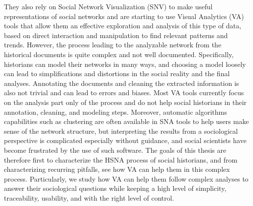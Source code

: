 They also rely on Social Network Visualization (SNV) to make useful representations of social networks and are starting to use Visual Analytics (VA) tools that allow them an effective exploration and analysis of this type of data, based on direct interaction and manipulation to find relevant patterns and trends.
However, the process leading to the analyzable network from the historical documents is quite complex and not well documented.
Specifically, historians can model their networks in many ways, and choosing a model loosely can lead to simplifications and distortions in the social reality and the final analyses.
Annotating the documents and cleaning the extracted information is also not trivial and can lead to errors and biases.
Most VA tools currently focus on the analysis part only of the process and do not help social historians in their annotation, cleaning, and modeling steps.
Moreover, automatic algorithms capabilities such as clustering are often available in SNA tools to help users make sense of the network structure, but interpreting the results from a sociological perspective is complicated especially without guidance, and social scientists have become frustrated by the use of such software\cite{lemercierBackSourcesPracticing2021}.
The goals of this thesis are therefore first to characterize the HSNA process of social historians, and from characterizing recurring pitfalls, see how VA can help them in this complex process.
Particularly, we study how VA can help them follow complex analyses to answer their sociological questions while keeping a high level of simplicity, traceability, usability, and with the right level of control.

%

